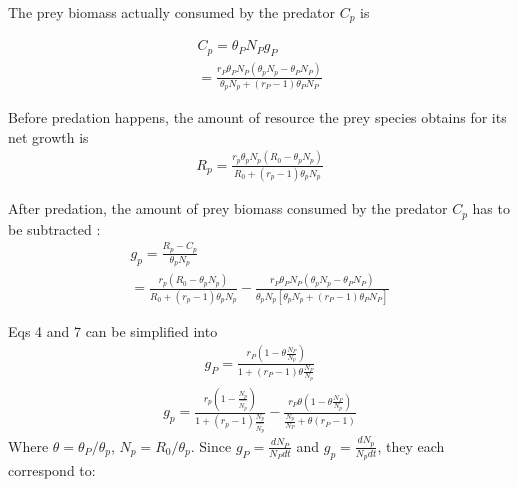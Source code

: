 \documentclass[12pt]{article}
\begin{document}
The prey biomass actually consumed by the predator $C_p$ is 

 \begin{equation}
 \begin{split}
C_p  = \theta_P N_P g_{P}\\
 =  \frac{r_{P} \theta_P N_P(\theta_{p} N_{p} - \theta_{P} N_{P} )}{ \theta_{p}N_{p} + (r_{P}-1) \theta_{P} N_{P}} 
\end{split}
\end{equation}

Before predation happens, the amount of resource the prey species obtains for its net growth is
 \begin{equation}
 \begin{split}
R_p = \frac{r_{p}\theta_{p} N_{p} (R_0 - \theta_p N_p )}{ R_0 + (r_p-1) \theta_{p} N_{p}} 
\end{split}
\end{equation}

After predation, the amount of prey biomass consumed by the predator $C_p$ has to be subtracted :
 \begin{equation}
 \begin{split}
g_p =  \frac{R_p - C_p}{\theta_p N_p}  \\
= \frac{r_{p} (R_0 - \theta_p N_p )}{ R_0 + (r_p-1) \theta_{p} N_{p}} - \frac{r_{P} \theta_P N_P(\theta_{p} N_{p} - \theta_{P} N_{P} )}{ \theta_p N_p [\theta_{p}N_{p} + (r_{P}-1) \theta_{P} N_{P}]}
\end{split}
\end{equation}

Eqs 4 and 7 can be simplified into
 \begin{equation}
 \begin{split}
g_{P} =  \frac{r_{P} (1 - \theta \frac{N_{P}}{N_{p}} )}{ 1+ (r_{P}-1) \theta \frac{N_{P}}{N_{p}}} 
\end{split}
\end{equation}
 \begin{equation}
 \begin{split}
g_{p}  = \frac{r_{p} (1 - \frac {N_p}{\hat{N_p} })}{ 1 + (r_p-1) \frac {N_p}{\hat{N_p} }} - \frac{r_{P} \theta (1 - \theta  \frac{N_{P}}{N_{p}} )}{  \frac{N_{p}}{N_{P}} + \theta (r_{P}-1)} 
\end{split}
\end{equation}
Where $\theta = \theta_P/\theta_p$, $\hat{N_p} = R_0/ \theta_p$. Since $g_P = \frac{d N_P}{N_P d t} $ and $g_p = \frac{d N_p}{N_p d t} $, they each correspond to:
\end{document}
